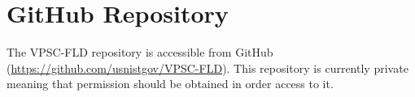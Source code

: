 \documentclass[12pt]{amsart}
\begin{document}
\section{GitHub Repository}
\label{sec:repo}
The VPSC-FLD repository is accessible from GitHub (\url{https://github.com/usnistgov/VPSC-FLD}).
This repository is currently private meaning that permission should be obtained in order access to it.
\newpage

{}
\end{document}
